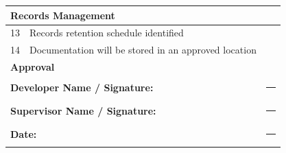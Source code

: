 \documentclass[11pt,letterpaper]{article}
\begin{document}
\begin{longtable}{@{}p{0.6cm}p{8.9cm}p{1.3cm}p{2.5cm}@{}}
\midrule
\multicolumn{4}{l}{\textbf{Records Management}} \\
\midrule
13 & Records retention schedule identified & & \\
\midrule
14 & Documentation will be stored in an approved location & & \\
\midrule
\multicolumn{4}{l}{\textbf{Approval}} \\
\midrule
\multicolumn{2}{l}{\textbf{Developer Name / Signature:}} & \multicolumn{2}{l}{\rule{4cm}{0.4pt}} \\
\midrule
\multicolumn{2}{l}{\textbf{Supervisor Name / Signature:}} & \multicolumn{2}{l}{\rule{4cm}{0.4pt}} \\
\midrule
\multicolumn{2}{l}{\textbf{Date:}} & \multicolumn{2}{l}{\rule{4cm}{0.4pt}} \\
\end{longtable}

\end{document}
